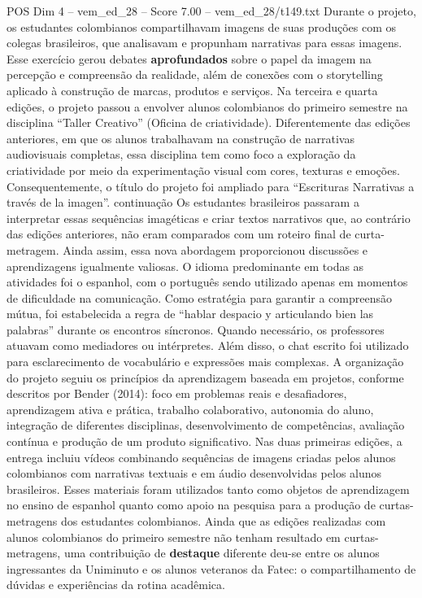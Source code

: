 \begin{textsample}{POS Dim 4 – vem\_ed\_28 – Score 7.00 – vem\_ed\_28/t149.txt}
Durante o projeto, os estudantes colombianos compartilhavam imagens de suas produções com os colegas brasileiros, que analisavam e propunham narrativas para essas imagens.
Esse exercício gerou debates \textbf{aprofundados} sobre o papel da imagem na percepção e compreensão da realidade, além de conexões com o storytelling aplicado à construção de marcas, produtos e serviços.
Na terceira e quarta edições, o projeto passou a envolver alunos colombianos do primeiro semestre na disciplina “Taller Creativo” (Oficina de criatividade).
Diferentemente das edições anteriores, em que os alunos trabalhavam na construção de narrativas audiovisuais completas, essa disciplina tem como foco a exploração da criatividade por meio da experimentação visual com cores, texturas e emoções.
Consequentemente, o título do projeto foi ampliado para “Escrituras Narrativas a través de la imagen”. continuação Os estudantes brasileiros passaram a interpretar essas sequências imagéticas e criar textos narrativos que, ao contrário das edições anteriores, não eram comparados com um roteiro final de curta-metragem.
Ainda assim, essa nova abordagem proporcionou discussões e aprendizagens igualmente valiosas.
O idioma predominante em todas as atividades foi o espanhol, com o português sendo utilizado apenas em momentos de dificuldade na comunicação.
Como estratégia para garantir a compreensão mútua, foi estabelecida a regra de “hablar despacio y articulando bien las palabras” durante os encontros síncronos.
Quando necessário, os professores atuavam como mediadores ou intérpretes.
Além disso, o chat escrito foi utilizado para esclarecimento de vocabulário e expressões mais complexas.
A organização do projeto seguiu os princípios da aprendizagem baseada em projetos, conforme descritos por Bender (2014): foco em problemas reais e desafiadores, aprendizagem ativa e prática, trabalho colaborativo, autonomia do aluno, integração de diferentes disciplinas, desenvolvimento de competências, avaliação contínua e produção de um produto significativo.
Nas duas primeiras edições, a entrega incluiu vídeos combinando sequências de imagens criadas pelos alunos colombianos com narrativas textuais e em áudio desenvolvidas pelos alunos brasileiros.
Esses materiais foram utilizados tanto como objetos de aprendizagem no ensino de espanhol quanto como apoio na pesquisa para a produção de curtas-metragens dos estudantes colombianos.
Ainda que as edições realizadas com alunos colombianos do primeiro semestre não tenham resultado em curtas-metragens, uma contribuição de \textbf{destaque} diferente deu-se entre os alunos ingressantes da Uniminuto e os alunos veteranos da Fatec: o compartilhamento de dúvidas e experiências da rotina acadêmica.

\end{textsample}
